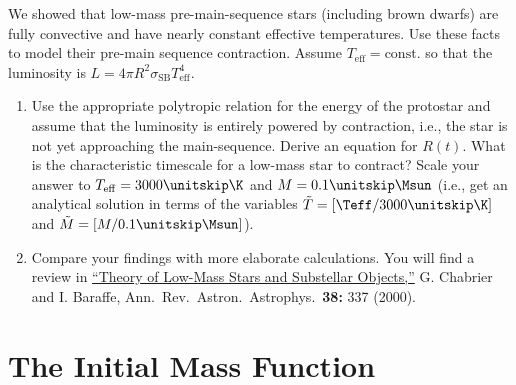 \begin{exercisebox}
We showed that low-mass pre-main-sequence stars (including brown dwarfs) are fully convective and have nearly constant effective temperatures.  Use these facts to model their pre-main sequence contraction.  Assume $T_{\mathrm{eff}} = \mathrm{const.}$ so that the luminosity is $L = 4\pi R^{2} \sigma_{\mathrm{SB}} T_{\mathrm{eff}}^{4}$.

\begin{enumerate}
\item Use the appropriate polytropic relation for the energy of the protostar and assume that the luminosity is entirely powered by contraction, i.e., the star is not yet approaching the main-sequence. Derive an equation for $R(t)$. What is the characteristic timescale for a low-mass star to contract? Scale your answer to $T_{\mathrm{eff}} = 3000\nsp\K$ and $M = 0.1\nsp\Msun$ (i.e., get an analytical solution in terms of the variables $\tilde{T} = [\Teff/3000\nsp\K]$ and $\tilde{M} = [M/0.1\nsp\Msun]$).

\item Compare your findings with more elaborate calculations.  You will find a review in \href{http://arxiv.org/abs/astro-ph/0006383}{``Theory of Low-Mass Stars and Substellar Objects,''} G. Chabrier and I. Baraffe, Ann.\ Rev.\ Astron.\ Astrophys.\ \textbf{38:} 337 (2000).
\end{enumerate}
\end{exercisebox}

\section{The Initial Mass Function}
\newcommand{\tms}{\ensuremath{\tau_{\mathrm{MS}}}}
\newcommand{\tauG}{\ensuremath{\tau_{\mathrm{G}}}}
\newcommand{\AIa}{\ensuremath{A_{\mathrm{Ia}}}}

